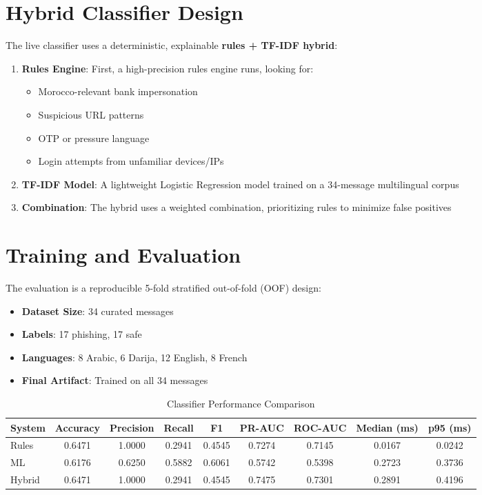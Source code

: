 \documentclass[12pt,a4paper,twoside]{report}
\begin{document}
\section{Hybrid Classifier Design}
The live classifier uses a deterministic, explainable \textbf{rules + TF-IDF hybrid}:
\begin{enumerate}
    \item \textbf{Rules Engine}: First, a high-precision rules engine runs, looking for:
    \begin{itemize}[noitemsep]
        \item Morocco-relevant bank impersonation
        \item Suspicious URL patterns
        \item OTP or pressure language
        \item Login attempts from unfamiliar devices/IPs
    \end{itemize}
    \item \textbf{TF-IDF Model}: A lightweight Logistic Regression model trained on a 34-message multilingual corpus
    \item \textbf{Combination}: The hybrid uses a weighted combination, prioritizing rules to minimize false positives
\end{enumerate}

\section{Training and Evaluation}
The evaluation is a reproducible 5-fold stratified out-of-fold (OOF) design:
\begin{itemize}[noitemsep]
    \item \textbf{Dataset Size}: 34 curated messages
    \item \textbf{Labels}: 17 phishing, 17 safe
    \item \textbf{Languages}: 8 Arabic, 6 Darija, 12 English, 8 French
    \item \textbf{Final Artifact}: Trained on all 34 messages
\end{itemize}

\begin{table}[h!]
    \centering
    \caption{Classifier Performance Comparison}
    \label{tab:classifier}
    \begin{tabularx}{\textwidth}{lcccccccc}
        \toprule
        \textbf{System} & \textbf{Accuracy} & \textbf{Precision} & \textbf{Recall} & \textbf{F1} & \textbf{PR-AUC} & \textbf{ROC-AUC} & \textbf{Median (ms)} & \textbf{p95 (ms)} \\
        \midrule
        Rules & 0.6471 & 1.0000 & 0.2941 & 0.4545 & 0.7274 & 0.7145 & 0.0167 & 0.0242 \\
        ML & 0.6176 & 0.6250 & 0.5882 & 0.6061 & 0.5742 & 0.5398 & 0.2723 & 0.3736 \\
        Hybrid & 0.6471 & 1.0000 & 0.2941 & 0.4545 & 0.7475 & 0.7301 & 0.2891 & 0.4196 \\
        \bottomrule
    \end{tabularx}
\end{table}
\end{document}
